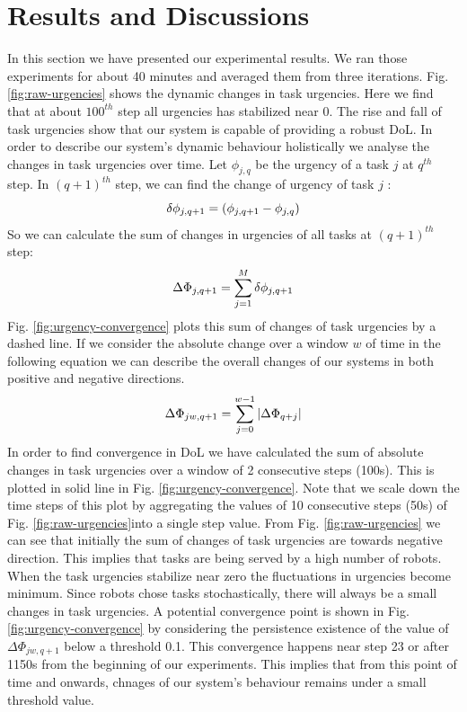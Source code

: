 \documentclass{llncs}
\begin{document}
\section{Results and Discussions}
\label{sec:results}
In this section we have presented  our experimental results. We ran those experiments for about 40 minutes and averaged them from three iterations.
Fig. \ref{fig:raw-urgencies} shows the dynamic changes in task urgencies. Here we find that at about $100^{th}$ step all urgencies has stabilized near 0. The rise and fall of task urgencies show that our system is capable of providing a robust DoL. 
In order to describe our system's dynamic behaviour holistically we analyse the changes in task urgencies over time. Let $ \phi_{j, q}$ be the urgency of a task $j$ at $q^{th}$ step. In $(q+1)^{th}$ step, we can find the change of  urgency of task $j$ :\\
\begin{equation} 
\small
\delta \phi_{j, q+1} = ( \phi_{j, q+1} - \phi_{j, q}) 
\end{equation}
So we can calculate the sum of changes in urgencies of all tasks at $(q+1)^{th}$ step:
\begin{equation} 
\small
\Delta \Phi_{j, q+1} = \sum_{j=1}^{M} \delta \phi_{j, q+1} 
\label{eqn:Delta-Phi}
\end{equation}
Fig. \ref{fig:urgency-convergence} plots this sum of changes of task urgencies by a dashed line. If we consider the absolute change over a window $w$ of time in the following equation we can describe the overall changes of our systems in both positive and negative directions.
%
\begin{equation}
\small
\Delta \Phi_{jw, q+1} = \sum_{j=0}^{w-1} \left | \Delta \Phi_{q+j} \right |
\end{equation}
%
In order to find convergence in DoL we have calculated the sum of absolute changes in task urgencies over a window of 2 consecutive steps (100s). This is plotted in solid line in Fig. \ref{fig:urgency-convergence}. Note that we scale down the time steps of this plot by aggregating the values of 10 consecutive steps (50s) of Fig. \ref{fig:raw-urgencies}into a single step value.
From Fig. \ref{fig:raw-urgencies} we can see that initially the sum of changes of task urgencies are towards negative direction. This implies that tasks are being served by a high number of robots. When the task urgencies stabilize near zero the fluctuations in urgencies become minimum. Since robots chose tasks stochastically, there will always be a small changes in task urgencies. A potential convergence point is shown in Fig. \ref{fig:urgency-convergence} by considering the persistence existence of the value of $\Delta \Phi_{jw, q+1}$ below a threshold 0.1. This convergence happens near step 23 or after 1150s from the beginning of our experiments. This implies that from this point of time and onwards, chnages of our system's behaviour remains under a small threshold value.\\
\end{document}
